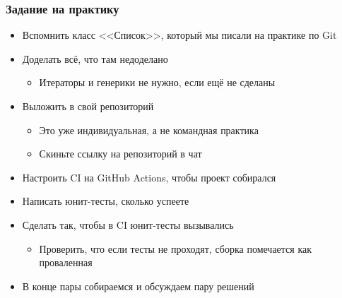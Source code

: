 \documentclass{../../slides-style}
\begin{document}
    
    \begin{frame}[plain]
        \titlepage
    \end{frame}

    \begin{frame}
        \frametitle{Задание на практику}
        \begin{itemize}
            \item Вспомнить класс <<Список>>, который мы писали на практике по Git
            \item Доделать всё, что там недоделано
            \begin{itemize}
                \item Итераторы и генерики не нужно, если ещё не сделаны
            \end{itemize}
            \item Выложить в свой репозиторий
            \begin{itemize}
                \item Это уже индивидуальная, а не командная практика
                \item Скиньте ссылку на репозиторий в чат
            \end{itemize}
            \item Настроить CI на GitHub Actions, чтобы проект собирался
            \item Написать юнит-тесты, сколько успеете
            \item Сделать так, чтобы в CI юнит-тесты вызывались
            \begin{itemize}
                \item Проверить, что если тесты не проходят, сборка помечается как проваленная
            \end{itemize}
            \item В конце пары собираемся и обсуждаем пару решений
        \end{itemize}
    \end{frame}
\end{document}
